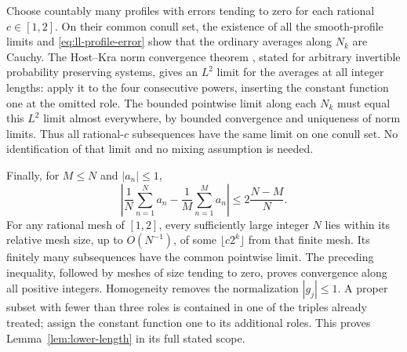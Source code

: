 Choose countably many profiles with errors tending to zero for each
rational $c\in[1,2]$.  On their common conull set, the existence of
all the smooth-profile limits and \eqref{eq:ll-profile-error} show
that the ordinary averages along $N_k$ are Cauchy.  The
Host--Kra norm convergence theorem \cite[Theorem~1.1]{HostKra},
stated for arbitrary invertible probability preserving systems,
gives an $L^2$ limit for the averages at all integer lengths: apply
it to the four consecutive powers, inserting the constant function
one at the omitted role.  The bounded pointwise limit along each
$N_k$ must equal this $L^2$ limit almost everywhere, by bounded
convergence and uniqueness of norm limits.  Thus all rational-$c$
subsequences have the same limit on one conull set.  No identification
of that limit and no mixing assumption is needed.

Finally, for $M\le N$ and $|a_n|\le1$,
\[
 \left|\frac1N\sum_{n=1}^Na_n-\frac1M\sum_{n=1}^Ma_n\right|
 \le 2\frac{N-M}{N}.
\]
For any rational mesh of $[1,2]$, every sufficiently large integer
$N$ lies within its relative mesh size, up to $O(N^{-1})$, of some
$\lfloor c2^k\rfloor$ from that finite mesh.  Its finitely many
subsequences have the common pointwise limit.  The preceding
inequality, followed by meshes of size tending to zero, proves
convergence along all positive integers.  Homogeneity removes the
normalization $|g_j|\le1$.  A proper subset with fewer than three
roles is contained in one of the triples already treated; assign
the constant function one to its additional roles.  This proves
Lemma~\ref{lem:lower-length} in its full stated scope.
